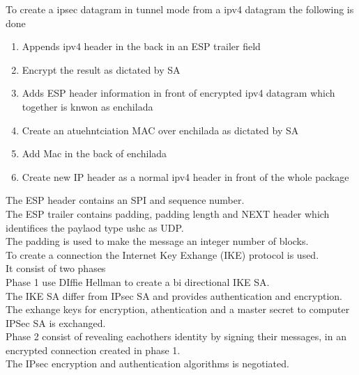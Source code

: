 \documentclass[12pt, a4paper]{article}
\begin{document}
		To create a ipsec datagram in tunnel mode from a ipv4 datagram the following is done
		\begin{enumerate}
			\item Appends ipv4 header in the back in an ESP trailer field
			\item Encrypt the result as dictated by SA
			\item Adds ESP header information in front of encrypted ipv4 datagram which together is knwon as enchilada
			\item Create an atuehntciation MAC over enchilada as dictated by SA
			\item Add Mac in the back of enchilada
			\item Create new IP header as a normal ipv4 header in front of the whole package
		\end{enumerate}
		The ESP header contains an SPI and sequence number.\\
		The ESP trailer contains padding, padding length and NEXT header which identifices the paylaod type ushc as UDP.\\
		The padding is used to make the message an integer number of blocks.\\
		To create a connection the Internet Key Exhange (IKE) protocol is used.\\
		It consist of two phases\\
		Phase 1 use DIffie Hellman to create a bi directional IKE SA.\\
		The IKE SA differ from IPsec SA and provides authentication and encryption.\\
		The exhange keys for encryption, athentication and a master secret to computer IPSec SA is exchanged.\\
		Phase 2 consist of revealing eachothers identity by signing their messages, in an encrypted connection created in phase 1.\\
		The IPsec encryption and authentication algorithms is negotiated.
\end{document}
